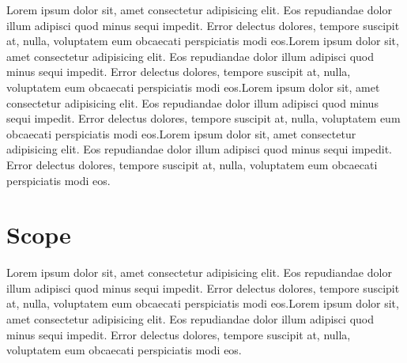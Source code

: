 Lorem ipsum dolor sit, amet consectetur adipisicing elit. Eos repudiandae dolor illum adipisci quod minus sequi impedit. Error delectus dolores, tempore suscipit at, nulla, voluptatem eum obcaecati perspiciatis modi eos.Lorem ipsum dolor sit, amet consectetur adipisicing elit. Eos repudiandae dolor illum adipisci quod minus sequi impedit. Error delectus dolores, tempore suscipit at, nulla, voluptatem eum obcaecati perspiciatis modi eos.Lorem ipsum dolor sit, amet consectetur adipisicing elit. Eos repudiandae dolor illum adipisci quod minus sequi impedit. Error delectus dolores, tempore suscipit at, nulla, voluptatem eum obcaecati perspiciatis modi eos.Lorem ipsum dolor sit, amet consectetur adipisicing elit. Eos repudiandae dolor illum adipisci quod minus sequi impedit. Error delectus dolores, tempore suscipit at, nulla, voluptatem eum obcaecati perspiciatis modi eos.

\section{Scope}
Lorem ipsum dolor sit, amet consectetur adipisicing elit. Eos repudiandae dolor illum adipisci quod minus sequi impedit. Error delectus dolores, tempore suscipit at, nulla, voluptatem eum obcaecati perspiciatis modi eos.Lorem ipsum dolor sit, amet consectetur adipisicing elit. Eos repudiandae dolor illum adipisci quod minus sequi impedit. Error delectus dolores, tempore suscipit at, nulla, voluptatem eum obcaecati perspiciatis modi eos.

